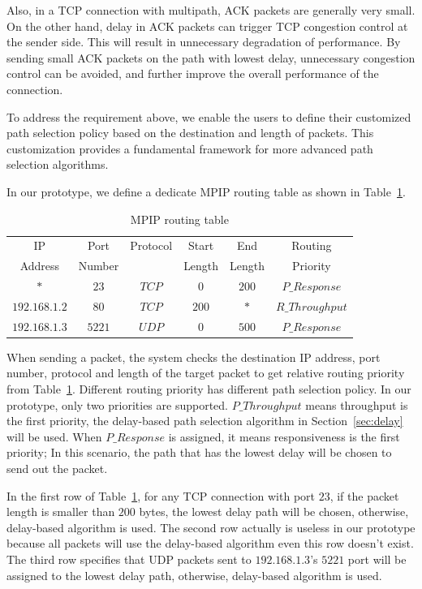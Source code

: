 Also, in a TCP connection with multipath, ACK packets are generally very small. On the other hand, delay in ACK packets can trigger TCP congestion control at the sender side. This will result in unnecessary degradation of performance. By sending small ACK packets on the path with lowest delay, unnecessary congestion control can be avoided, and further improve the overall performance of the connection.

To address the requirement above, we enable the users to define their customized path selection policy based on the destination and  length of packets. This customization provides a fundamental framework for more advanced path selection algorithms.

In our prototype, we define a dedicate MPIP routing table as shown in Table~\ref{tb.route}.

\begin{table}[htbp]
\caption{\label{tb.route}MPIP routing table}
\centering
\begin{tabular}{|c|c|c|c|c|c|}
\hline
 IP   		&   Port      & Protocol      & Start  & End    & Routing       \\
 Address    &  Number     &               & Length & Length & Priority       \\
\hline
$*$&$23$&$TCP$&$0$&$200$&$P\_Response$   \\
\hline
$192.168.1.2$&$80$&$TCP$&$200$&$*$&$R\_Throughput$   \\
\hline
$192.168.1.3$&$5221$&$UDP$&$0$&$500$&$P\_Response$  \\
\hline
\end{tabular}
\end{table}

When sending a packet, the system checks the destination IP address, port number, protocol and length of the target packet to get relative routing priority from Table~\ref{tb.route}. Different routing priority has different path selection policy. In our prototype, only two priorities are supported. $P\_Throughput$ means throughput is the first priority, the delay-based path selection algorithm in Section~\ref{sec:delay} will be used. When $P\_Response$ is assigned, it means responsiveness is the first priority; In this scenario, the path that has the lowest delay will be chosen to send out the packet.

In the first row of Table~\ref{tb.route}, for any TCP connection with port $23$, if the packet length is smaller than $200$ bytes, the lowest delay path will be chosen, otherwise, delay-based algorithm is used. The second row actually is useless in our prototype because all packets will use the delay-based algorithm even this row doesn't exist. The third row specifies that UDP packets sent to $192.168.1.3$'s $5221$ port will be assigned to the lowest delay path, otherwise, delay-based algorithm is used.


